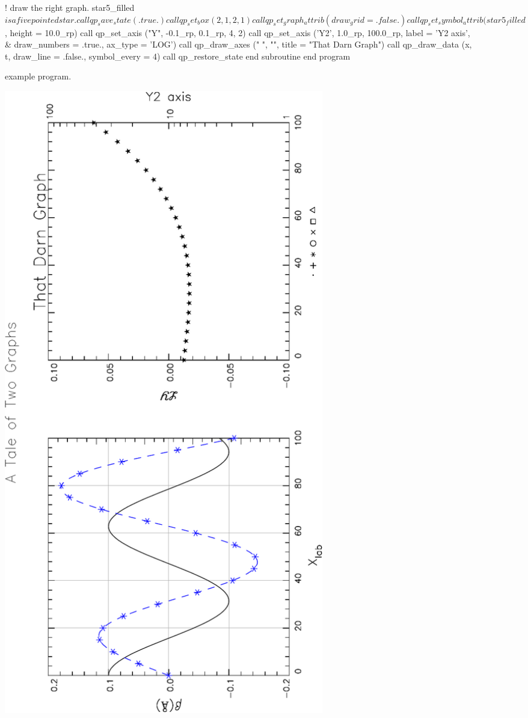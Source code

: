 \begin{figure}
\begin{listing}{1}
    ! draw the right graph. star5_filled$ is a five pointed star.
    call qp_save_state (.true.)
    call qp_set_box (2, 1, 2, 1)
    call qp_set_graph_attrib (draw_grid = .false.)
    call qp_set_symbol_attrib (star5_filled$, height = 10.0_rp)
    call qp_set_axis ("Y", -0.1_rp, 0.1_rp, 4, 2)
    call qp_set_axis ('Y2', 1.0_rp, 100.0_rp, label = 'Y2 axis', &
                                draw_numbers = .true., ax_type = 'LOG')
    call qp_draw_axes ("      ", "\fsLY\fn", title = "That Darn Graph")
    call qp_draw_data (x, t, draw_line = .false., symbol_every = 4)
    call qp_restore_state
  end subroutine
  end program
\end{listing}
\caption{\quickplot example program.}
\label{f:plot.example}
\end{figure}


\begin{figure}
\centering
\includegraphics[angle=-90,width=5.5in]{plot-example.pdf}

\end{figure}
